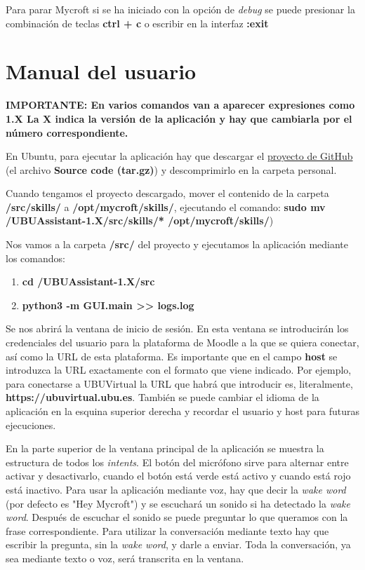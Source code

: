 Para parar Mycroft si se ha iniciado con la opción de \textit{debug} se puede presionar la combinación de teclas \textbf{ctrl + c} o escribir en la interfaz \textbf{:exit}


\section{Manual del usuario}

\textbf{IMPORTANTE: En varios comandos van a aparecer expresiones como 1.X La X indica la versión de la aplicación y hay que cambiarla por el número correspondiente.}

En Ubuntu, para ejecutar la aplicación hay que descargar el \href{https://github.com/adp1002/UBUAssistant/releases}{proyecto de GitHub} (el archivo \textbf{Source code (tar.gz)}) y  descomprimirlo en la carpeta personal.


Cuando tengamos el proyecto descargado, mover el contenido de la carpeta \textbf{\detokenize{~}/src/skills/} a \textbf{/opt/mycroft/skills/}, ejecutando el comando:
\textbf{sudo mv \detokenize{~}/UBUAssistant-1.X/src/skills/* /opt/mycroft/skills/})

Nos vamos a la carpeta \textbf{/src/} del proyecto y ejecutamos la aplicación mediante los comandos:
\begin{enumerate}
	\item \textbf{cd \detokenize{~}/UBUAssistant-1.X/src}
	\item \textbf{python3 -m GUI.main >\null> logs.log}
\end{enumerate}
Se nos abrirá la ventana de inicio de sesión. En esta ventana se introducirán los credenciales del usuario para la plataforma de Moodle a la que se quiera conectar, así como la URL de esta plataforma.
Es importante que en el campo \textbf{host} se introduzca la URL exactamente con el formato que viene indicado. Por ejemplo, para conectarse a UBUVirtual la URL que habrá que introducir es, literalmente, \textbf{https://ubuvirtual.ubu.es}.
También se puede cambiar el idioma de la aplicación en la esquina superior derecha y recordar el usuario y host para futuras ejecuciones.


En la parte superior de la ventana principal de la aplicación se muestra la estructura de todos los \textit{intents}. El botón del micrófono sirve para alternar entre activar y desactivarlo, cuando el botón está verde está activo y cuando está rojo está inactivo.
Para usar la aplicación mediante voz, hay que decir la \textit{wake word} (por defecto es "Hey Mycroft") y se escuchará un sonido si ha detectado la \textit{wake word}. Después de escuchar el sonido se puede preguntar lo que queramos con la frase correspondiente. Para utilizar la conversación mediante texto hay que escribir la pregunta, sin la \textit{wake word}, y darle a enviar. Toda la conversación, ya sea mediante texto o voz, será transcrita en la ventana.

